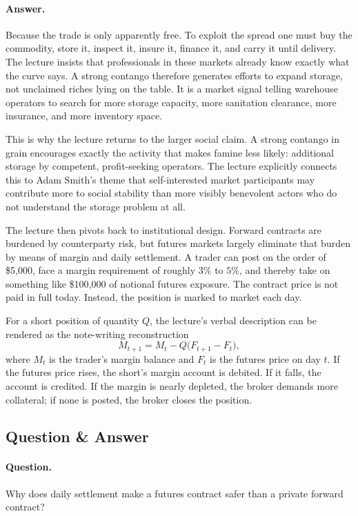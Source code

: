 \paragraph{Answer.} Because the trade is only apparently free. To exploit the spread one must buy the commodity, store it, inspect it, insure it, finance it, and carry it until delivery. The lecture insists that professionals in these markets already know exactly what the curve says. A strong contango therefore generates efforts to expand storage, not unclaimed riches lying on the table. It is a market signal telling warehouse operators to search for more storage capacity, more sanitation clearance, more insurance, and more inventory space.

This is why the lecture returns to the larger social claim. A strong contango in grain encourages exactly the activity that makes famine less likely: additional storage by competent, profit-seeking operators. The lecture explicitly connects this to Adam Smith's theme that self-interested market participants may contribute more to social stability than more visibly benevolent actors who do not understand the storage problem at all.

The lecture then pivots back to institutional design. Forward contracts are burdened by counterparty risk, but futures markets largely eliminate that burden by means of margin and daily settlement. A trader can post on the order of \$5{,}000, face a margin requirement of roughly $3\%$ to $5\%$, and thereby take on something like \$100{,}000 of notional futures exposure. The contract price is not paid in full today. Instead, the position is marked to market each day.

For a short position of quantity $Q$, the lecture's verbal description can be rendered as the note-writing reconstruction
\begin{equation}
M_{t+1}=M_t-Q\bigl(F_{t+1}-F_t\bigr),
\end{equation}
where $M_t$ is the trader's margin balance and $F_t$ is the futures price on day $t$. If the futures price rises, the short's margin account is debited. If it falls, the account is credited. If the margin is nearly depleted, the broker demands more collateral; if none is posted, the broker closes the position.

\subsection{Question \& Answer}

\paragraph{Question.} Why does daily settlement make a futures contract safer than a private forward contract?

